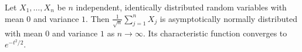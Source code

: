 Let $X_1, \ldots, X_n$ be $n$ independent, identically distributed random variables with mean $0$ and variance $1$. Then $\frac{1}{\sqrt{n}}\sum_{j=1}^{n} X_j$ is asymptotically normally distributed with mean $0$ and variance $1$ as $n \to \infty$. Its characteristic function converges to $e^{-t^2/2}$.
